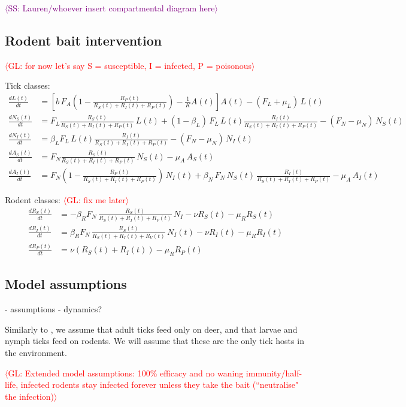 \documentclass[12pt, centerh1]{article}
\newcommand{\sophie}[1]{{\textcolor{purple}{$\langle$SS: #1$\rangle$}}}
\newcommand{\geneva}[1]{{\textcolor{red}{$\langle$GL: #1$\rangle$}}}
\begin{document}
\sophie{Lauren/whoever insert compartmental diagram here}

\subsection{Rodent bait intervention}

\geneva{for now let's say S = susceptible, I = infected, P = poisonous}

Tick classes:
\begin{align}
    \frac{dL(t)}{dt} &= \left[b \,F_A \left(1 - \frac{R_P(t)}{R_S(t) + R_I(t) + R_P(t)}\right) - \frac{1}{K} A(t)\right]A(t) - (F_L + \mu_L) \,L(t) \\
    \frac{dN_S(t)}{dt} &= F_L\frac{R_S(t)}{R_S(t) + R_I(t) + R_P(t)}\,L(t) + (1-\beta_L)\,F_L \,L(t) \frac{R_I(t)}{R_S(t) + R_I(t) + R_P(t)} - (F_N - \mu_N) \,N_S(t) \\
    \frac{dN_I(t)}{dt} &= \beta_L F_L \,L(t) \frac{R_I(t)}{R_S(t) + R_I(t) + R_P(t)} - (F_N - \mu_N) \,N_I(t) \\
    \frac{dA_S(t)}{dt} &= F_N\frac{R_S(t)}{R_S(t) + R_I(t) + R_P(t)}\,N_S(t) - \mu_A \,A_S(t) \\
    \frac{dA_I(t)}{dt} &= F_N\left(1-\frac{R_P(t)}{R_S(t) + R_I(t) + R_P(t)}\right)\,N_I(t) + \beta_N \,F_N \,N_S(t) \, \frac{R_I(t)}{R_S(t) + R_I(t) + R_P(t)} - \mu_A \,A_I(t)
\end{align}

Rodent classes: \geneva{fix me later}
\begin{align}
    \frac{dR_S(t)}{dt} &= -\beta_R F_N \,\frac{R_S(t)}{R_S(t) + R_I(t) + R_V(t)} \,N_I - \nu R_S(t) - \mu_R R_S(t) \\
    \frac{dR_I(t)}{dt} &= \beta_R F_N \,\frac{R_S(t)}{R_S(t) + R_I(t) + R_V(t)} \,N_I(t) - \nu R_I(t) - \mu_R R_I(t) \\
    \frac{dR_P(t)}{dt} &= \nu (R_S(t) + R_I(t)) - \mu_R R_P(t)
\end{align}

\subsection{Model assumptions}
- assumptions
- dynamics?

Similarly to \citet{lou2014tick}, we assume that adult ticks feed only on deer, and that larvae and nymph ticks feed on rodents. We will assume that these are the only tick hosts in the environment.

\geneva{Extended model assumptions: 100\% efficacy and no waning immunity/half-life, infected rodents stay infected forever unless they take the bait (``neutralise" the infection)}
\end{document}
